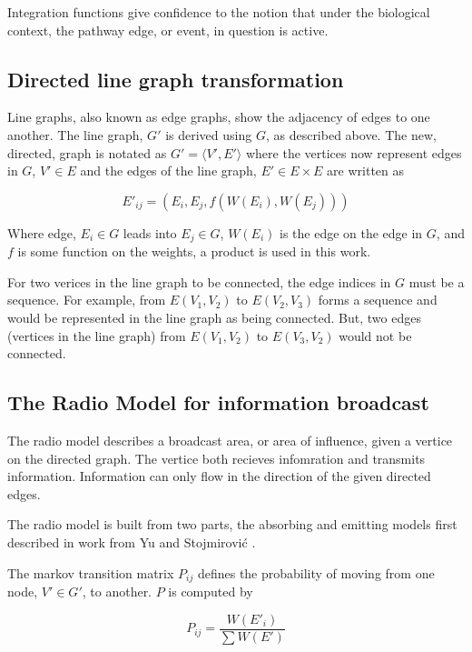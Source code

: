 \documentclass[twoside]{article}
\begin{document}
\begin{multicols}{2}
Integration functions give confidence to the notion that
under the biological context, the pathway edge, or event, in question is active. 

\subsection{Directed line graph transformation}

Line graphs, also known as edge graphs, show the adjacency of edges to 
one another. The line graph, $G'$ is derived using $G$, as described
above. The new, directed, graph is notated as $G' = \langle V', E' \rangle$ where
the vertices now represent edges in $G$, $V' \in E$ and the edges of the line
graph, $E' \in E \times E$ are written as 

\begin{equation}
\label{line-graph-edges}
E'_{ij} = (E_i, E_j, \mathit{f} (W(E_i), W(E_j)))
\end{equation}

Where edge, $E_i \in G$ leads into $E_j \in G$, $W(E_i)$ is the edge
on the edge in $G$, and $\mathit{f}$ is some function on the weights,
a product is used in this work.

For two verices in the line graph to be connected, the edge indices
in $G$ must be a sequence. For example, from $E(V_1, V_2)$ to $E(V_2,
V_3)$ forms a sequence and would be represented in the line graph as
being connected. But, two edges (vertices in the line graph) from $E(V_1, V_2)$ to $E(V_3,
V_2)$ would not be connected.
 
\subsection{The Radio Model for information broadcast}

The radio model describes a broadcast area, or area of influence,
given a vertice on the directed graph. The vertice both recieves
infomration and transmits information. Information can only flow
in the direction of the given directed edges.

The radio model is built from two parts, the absorbing and emitting
models first described in work from Yu and Stojmirovi\'{c} \citep{Stojmirovic:2007eg}.
 
The markov transition matrix $P_{ij}$ defines the probability of
moving from one node, $V' \in G'$, to another. $P$ is computed by

\begin{equation}
\label{transition-matrix}
P_{ij} = \frac{W(E'_i)} {\sum W(E')}
\end{equation}



\end{multicols}
\end{document}
